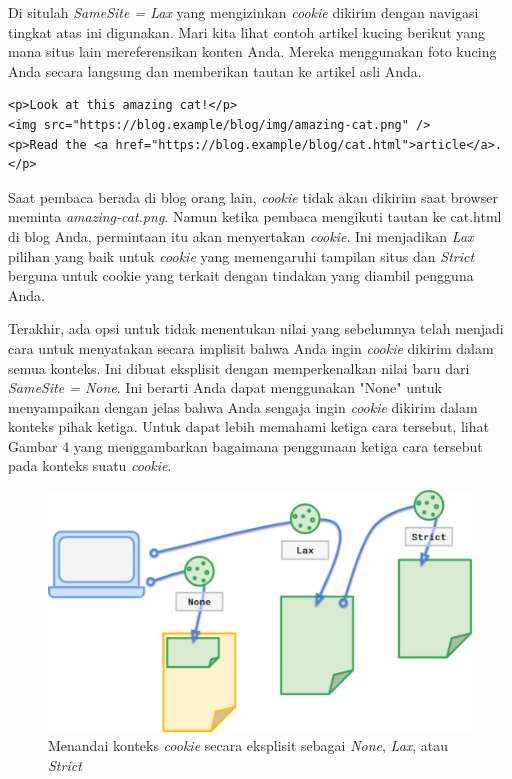 \documentclass{article}
\begin{document}
Di situlah \textit{SameSite = Lax} yang mengizinkan \textit{cookie} dikirim dengan navigasi tingkat atas ini digunakan. Mari kita lihat contoh artikel kucing berikut yang mana situs lain mereferensikan konten Anda. Mereka menggunakan foto kucing Anda secara langsung dan memberikan tautan ke artikel asli Anda.
\begin{lstlisting}
<p>Look at this amazing cat!</p>
<img src="https://blog.example/blog/img/amazing-cat.png" />
<p>Read the <a href="https://blog.example/blog/cat.html">article</a>.</p>
\end{lstlisting}

Saat pembaca berada di blog orang lain, \textit{cookie} tidak akan dikirim saat browser meminta \textit{amazing-cat.png}. Namun ketika pembaca mengikuti tautan ke cat.html di blog Anda, permintaan itu akan menyertakan \textit{cookie}. Ini menjadikan \textit{Lax} pilihan yang baik untuk \textit{cookie} yang memengaruhi tampilan situs dan \textit{Strict} berguna untuk cookie yang terkait dengan tindakan yang diambil pengguna Anda. 

Terakhir, ada opsi untuk tidak menentukan nilai yang sebelumnya telah menjadi cara untuk menyatakan secara implisit bahwa Anda ingin \textit{cookie} dikirim dalam semua konteks. Ini dibuat eksplisit dengan memperkenalkan nilai baru dari \textit{SameSite = None}. Ini berarti Anda dapat menggunakan "None" untuk menyampaikan dengan jelas bahwa Anda sengaja ingin \textit{cookie} dikirim dalam konteks pihak ketiga. Untuk dapat lebih memahami ketiga cara tersebut, lihat Gambar 4 yang menggambarkan bagaimana penggunaan ketiga cara tersebut pada konteks suatu \textit{cookie}.
\begin{figure}[htbp]
    \centering
    \includegraphics[scale=.3]{cookie context}
    \caption{Menandai konteks \textit{cookie} secara eksplisit sebagai \textit{None}, \textit{Lax}, atau \textit{Strict}}
    \label{fig:cookiecontext}
\end{figure}
\end{document}
